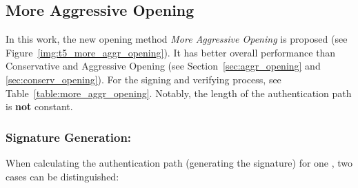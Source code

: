 \subsection{More Aggressive Opening}
\label{sec:more_aggr_opening}
In this work, the new opening method \textit{More Aggressive Opening} is proposed (see Figure~\ref{img:t5_more_aggr_opening}). It has better overall performance than Conservative and Aggressive Opening (see Section~\ref{sec:aggr_opening} and \ref{sec:conserv_opening}). For the signing and verifying process, see Table~\ref{table:more_aggr_opening}. Notably, the length of the authentication path is \textbf{not} constant.

\subsubsection{Signature Generation: \texorpdfstring{\tfblock}{T5-Block}}
When calculating the authentication path (generating the signature) for one \tfblock, two cases can be distinguished:

